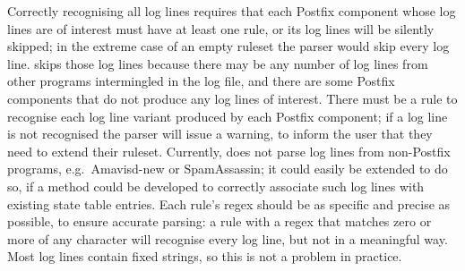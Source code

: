 Correctly recognising all log lines requires that each Postfix component
whose log lines are of interest must have at least one rule, or its log
lines will be silently skipped; in the extreme case of an empty ruleset the
parser would skip every log line.  \parsername{} skips those log lines
because there may be any number of log lines from other programs
intermingled in the log file, and there are some Postfix components that do
not produce any log lines of interest.  There must be a rule to recognise
each log line variant produced by each Postfix component; if a log line is
not recognised the parser will issue a warning, to inform the user that
they need to extend their ruleset.  Currently, \parsername{} does not parse
log lines from non-Postfix programs, e.g.\ Amavisd-new or SpamAssassin; it
could easily be extended to do so, if a method could be developed to
correctly associate such log lines with existing state table entries.  Each
rule's regex should be as specific and precise as possible, to ensure
accurate parsing: a rule with a regex that matches zero or more of any
character will recognise every log line, but not in a meaningful way.  Most
log lines contain fixed strings, so this is not a problem in practice.

